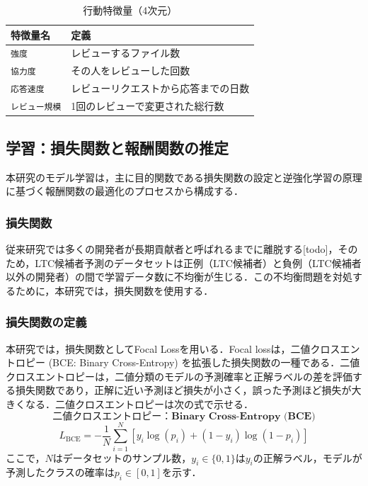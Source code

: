 \documentclass[submit,techrep,noauthor]{ipsj}
\begin{document}
\begin{table}[h]
    \centering
    \label{table:actionList}
    \caption{行動特徴量（4次元）}
        \begin{tabular}{@{}ll@{}}
        \toprule
        \textbf{特徴量名} & \textbf{定義} \\
        \midrule
        \texttt{強度} & レビューするファイル数 \\
        \texttt{協力度} & その人をレビューした回数 \\
        \texttt{応答速度} & レビューリクエストから応答までの日数 \\
        \texttt{レビュー規模} & 1回のレビューで変更された総行数 \\
        \bottomrule
    \end{tabular}
\end{table}





\subsection{学習：損失関数と報酬関数の推定}
本研究のモデル学習は，主に目的関数である損失関数の設定と逆強化学習の原理に基づく報酬関数の最適化のプロセスから構成する．

\subsubsection{損失関数}

従来研究では多くの開発者が長期貢献者と呼ばれるまでに離脱する[todo]，そのため，LTC候補者予測のデータセットは正例（LTC候補者）と負例（LTC候補者以外の開発者）の間で学習データ数に不均衡が生じる．この不均衡問題を対処するために，本研究では，損失関数を使用する．

\subsubsection{損失関数の定義}

本研究では，損失関数としてFocal Lossを用いる．Focal lossは，二値クロスエントロピー (BCE: Binary Cross-Entropy) を拡張した損失関数の一種である．二値クロスエントロピーは，二値分類のモデルの予測確率と正解ラベルの差を評価する損失関数であり，正解に近い予測ほど損失が小さく，誤った予測ほど損失が大きくなる．二値クロスエントロピーは次の式で示せる．
\[\textbf{二値クロスエントロピー：Binary Cross-Entropy (BCE)}\]
\[
L_{\mathrm{BCE}} = - \frac{1}{N} \sum_{i=1}^{N} \left[ y_i\log(p_i) + (1 - y_i)\log(1 - p_i)\right]
\]
ここで，$N$はデータセットのサンプル数，$y_i \in \{0, 1\}$は$y_i$の正解ラベル，モデルが予測したクラスの確率は$p_i \in [0, 1]$を示す．
\end{document}
